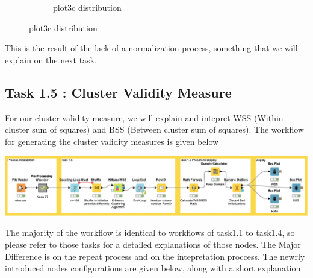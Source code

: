 \documentclass[11pt]{article}
\begin{document}
\begin{figure}[H]
\begin{subfigure}{0.4\textwidth}
					\caption{plot3c distribution}
					\label{fig:third}
				\end{subfigure}	
				\label{fig:figures}
			\end{figure}
			\fi
			 This is the result of the lack of a normalization process, something that we will explain on the next task.
		\subsection*{Task 1.5 : Cluster Validity Measure}
			For our cluster validity measure, we will explain and intepret WSS (Within cluster sum of squares) and BSS (Between cluster sum of squares). The workflow for generating the cluster validity measures is given below
			\iftrue
			\begin{center}
				\includegraphics[scale=0.25]{res/t1/t15/t15-workflow}
			\end{center}
			\fi
			The majority of the workflow is identical to workflows of task1.1 to task1.4, so please refer to those tasks for a detailed explanations of those nodes. The Major Difference is on the repeat process and on the intepretation proccess. The newrly introduced nodes configurations are given below, along with a short explanation
			\iftrue
\end{document}
